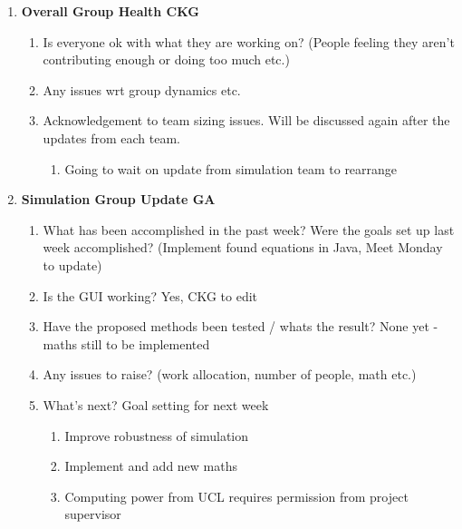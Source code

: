 \begin{enumerate}
\item  \textbf{Overall Group Health CKG}

\begin{enumerate}
\item \textbf{ }Is everyone ok with what they are working on? (People feeling they aren't contributing enough or doing too much etc.)

\item  Any issues wrt group dynamics etc.

\item  Acknowledgement to team sizing issues. Will be discussed again after the updates from each team.

\begin{enumerate}
\item  Going to wait on update from simulation team to rearrange\\
\end{enumerate}
\end{enumerate}

\item  \textbf{Simulation Group Update GA}

\begin{enumerate}
\item \textbf{ }What has been accomplished in the past week? Were the goals set up last week accomplished? (Implement found equations in Java, Meet Monday to update)

\item  Is the GUI working? Yes, CKG to edit

\item  Have the proposed methods been tested / whats the result? None yet - maths still to be implemented

\item  Any issues to raise? (work allocation, number of people,  math etc.)

\item  What's next? Goal setting for next week

\begin{enumerate}
\item  Improve robustness of simulation

\item  Implement and add new maths

\item  Computing power from UCL requires permission from project supervisor\\
\end{enumerate}
\end{enumerate}


\end{enumerate}
